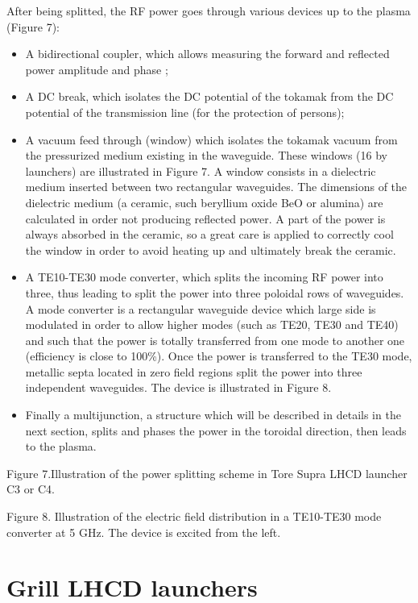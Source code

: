 After being splitted, the RF power goes through various devices up to the plasma (Figure 7): 
\begin{itemize}
 \item A bidirectional coupler, which allows measuring the forward and reflected power amplitude and phase ;
\item A DC break, which isolates the DC potential of the tokamak from the DC potential of the transmission line (for the protection of persons);
\item A vacuum feed through (window) which isolates the tokamak vacuum from the pressurized medium existing in the waveguide. These windows (16 by launchers) are illustrated in Figure 7. A window consists in a dielectric medium inserted between two rectangular waveguides. The dimensions of the dielectric medium (a ceramic, such beryllium oxide BeO or alumina) are calculated in order not producing reflected power. A part of the power is always absorbed in the ceramic, so a great care is applied to correctly cool the window in order to avoid heating up and ultimately break the ceramic.
\item A TE10-TE30 mode converter, which splits the incoming RF power into three, thus leading to split the power into three poloidal rows of waveguides. A mode converter is a rectangular waveguide device which large side is modulated in order to allow higher modes (such as TE20, TE30 and TE40) and such that the power is totally transferred from one mode to another one (efficiency is close to 100\%). Once the power is transferred to the TE30 mode, metallic septa located in zero field regions split the power into three independent waveguides. The device is illustrated in Figure 8.
\item Finally a multijunction, a structure which will be described in details in the next section, splits and phases the power in the toroidal direction, then leads to the plasma. 
\end{itemize}



Figure 7.Illustration of the power splitting scheme in Tore Supra LHCD launcher C3 or C4.  


Figure 8. Illustration of the electric field distribution in a TE10-TE30 mode converter at 5 GHz. The device is excited from the left.

\section{Grill LHCD launchers}
